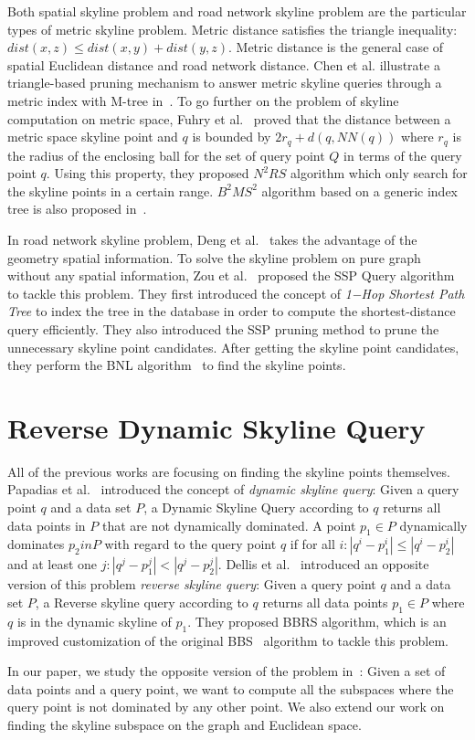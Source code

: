 Both spatial skyline problem and road network skyline problem are the particular types of metric skyline problem. Metric distance satisfies the triangle inequality: $dist(x, z) \leq dist(x, y) + dist(y, z)$. Metric distance is the general case of spatial Euclidean distance and road network distance. Chen et al. illustrate a triangle-based pruning mechanism to answer metric skyline queries through a metric index with M-tree in~\cite{chen2008dynamic}. To go further on the problem of skyline computation on metric space, Fuhry et al.~\cite{fuhry2009efficient} proved that the distance between a metric space skyline point and $q$ is bounded by $2r_q + d(q, NN(q))$ where $r_q$ is the radius of the enclosing ball for the set of query point $Q$ in terms of the query point $q$. Using this property, they proposed $N^2RS$ algorithm which only search for the skyline points in a certain range. $B^2MS^2$ algorithm based on a generic index tree is also proposed in~\cite{fuhry2009efficient}.

In road network skyline problem, Deng et al.~\cite{deng2007multi} takes the advantage of the geometry spatial information. To solve the skyline problem on pure graph without any spatial information, Zou et al.~\cite{zou2010dynamic} proposed the SSP Query algorithm to tackle this problem. They first introduced the concept of \emph{1−Hop Shortest Path Tree} to index the tree in the database in order to compute the shortest-distance query efficiently. They also introduced the SSP pruning method to prune the unnecessary skyline point candidates. After getting the skyline point candidates, they perform the BNL algorithm~\cite{borzsony2001skyline} to find the skyline points.

\section{Reverse Dynamic Skyline Query}
All of the previous works are focusing on finding the skyline points themselves. Papadias et al.~\cite{papadias2003optimal} introduced the concept of \emph{dynamic skyline query}: Given a query point $q$ and a data set $P$, a Dynamic Skyline Query according to $q$ returns all data points in $P$ that are not dynamically dominated. A point $p_1 \in P$ dynamically dominates $p_2 in P$ with regard to the query point $q$ if for all $i: |q^i-p^i_1| \leq |q^i-p^i_2|$ and at least one $j: |q^j-p^j_1| < |q^j-p^j_2|$. Dellis et al.~\cite{dellis2007efficient} introduced an opposite version of this problem \emph{reverse skyline query}: Given a query point $q$ and a data set $P$, a Reverse skyline query according to $q$ returns all data points $p_1 \in P$ where $q$ is in the dynamic skyline of $p_1$. They proposed BBRS algorithm, which is an improved customization of the original BBS~\cite{papadias2003optimal} algorithm to tackle this problem.

In our paper, we study the opposite version of the problem in~\cite{tao2006subsky}: Given a set of data points and a query point, we want to compute all the subspaces where the query point is not dominated by any other point. We also extend our work on finding the skyline subspace on the graph and Euclidean space.



